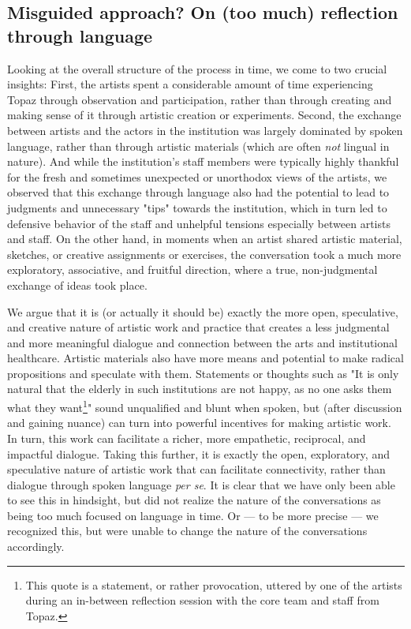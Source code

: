 \documentclass[authordate, empirical]{jote-new-article}
\begin{document}
{	\subsection{Misguided approach? On (too much) reflection through language}



	Looking at the overall structure of the process in time, we come to two crucial insights: First, the artists spent a considerable amount of time experiencing Topaz through observation and participation, rather than through creating and making sense of it through artistic creation or experiments. Second, the exchange between artists and the actors in the institution was largely dominated by spoken language, rather than through artistic materials (which are often \emph{not} lingual in nature). And while the institution's staff members were typically highly thankful for the fresh and sometimes unexpected or unorthodox views of the artists, we observed that this exchange through language also had the potential to lead to judgments and unnecessary "tips" towards the institution, which in turn led to defensive behavior of the staff and unhelpful tensions especially between artists and staff. On the other hand, in moments when an artist shared artistic material, sketches, or creative assignments or exercises, the conversation took a much more exploratory, associative, and fruitful direction, where a true, non-judgmental exchange of ideas took place.







	We argue that it is (or actually it should be) exactly the more open, speculative, and creative nature of artistic work and practice that creates a less judgmental and more meaningful dialogue and connection between the arts and institutional healthcare. Artistic materials also have more means and potential to make radical propositions and speculate with them. Statements or thoughts such as "It is only natural that the elderly in such institutions are not happy, as no one asks them what they want\footnote{This quote is a statement, or rather provocation, uttered by one of the artists during an in-between reflection session with the core team and staff from Topaz.}" sound unqualified and blunt when spoken, but (after discussion and gaining nuance) can turn into powerful incentives for making artistic work. In turn, this work can facilitate a richer, more empathetic, reciprocal, and impactful dialogue. Taking this further, it is exactly the open, exploratory, and speculative nature of artistic work that can facilitate connectivity, rather than dialogue through spoken language \emph{per se}. It is clear that we have only been able to see this in hindsight, but did not realize the nature of the conversations as being too much focused on language in time. Or --- to be more precise --- we recognized this, but were unable to change the nature of the conversations accordingly.







}
\end{document}
